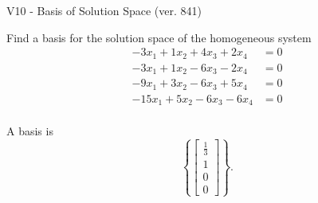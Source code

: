 \begin{exercise}
  \begin{exerciseTitle}V10 - Basis of Solution Space (ver. 841)\end{exerciseTitle}
  \begin{exerciseStatement}
    Find a basis for the solution space of the homogeneous system 
\begin{align*}
 -3 x_ 1 + 1 x_ 2 + 4 x_ 3 + 2 x_ 4 &= 0  \\ 
  -3 x_ 1 + 1 x_ 2 -6 x_ 3 -2 x_ 4 &= 0  \\ 
  -9 x_ 1 + 3 x_ 2 -6 x_ 3 + 5 x_ 4 &= 0  \\ 
  -15 x_ 1 + 5 x_ 2 -6 x_ 3 -6 x_ 4 &= 0  \\ 
 \end{align*}


 
  \end{exerciseStatement}

  \begin{exerciseAnswer}
   A basis is   
\[\left\{\left[\begin{array}{c}
\frac{1}{3} \\
1 \\
0 \\
0
\end{array}\right]\right\}.\]

  


  \end{exerciseAnswer}
\end{exercise}